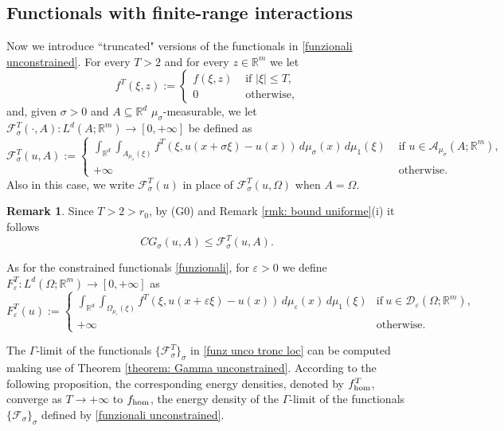\documentclass{article}
\theoremstyle{plain}
\theoremstyle{definition}
\newtheorem{remark}[theorem]{Remark}
\def\e{\varepsilon}
\def\rr{{\mathbb R}}
\def\ms{\mu_\sigma}
\newcommand{\s}{\sigma}
\newcommand{\A}{\mathcal{A}}
\newcommand{\F}{\mathcal{F}}
\numberwithin{equation}{section}
\begin{document}
\subsection{Functionals with finite-range interactions} Now we introduce ``truncated" versions of the functionals in \eqref{funzionali unconstrained}. For every $T>2$ and for every $z\in\rr^m$ we let
\begin{equation*}
    f^T(\xi,z):=\begin{cases} f(\xi,z) &\text{ if } |\xi|\leq T, \\
    0 &\text{ otherwise},
\end{cases}
\end{equation*}
 and, given $\s>0$ and $A\subseteq\rr^d$ $\ms$-measurable, we let $\mathcal{F}^T_\s(\cdot, A):L^d(A;\mathbb{R}^{m})\rightarrow [0,+\infty]$ be defined as
\begin{equation}\label{funz unco tronc loc}
\mathcal{F}^T_{\s}(u,A):=\begin{cases}
\displaystyle\int_{\mathbb{R}^{d}}\int_{A_{\ms}(\xi)}f^T(\xi, u(x+\s\xi)-u(x))\, d\ms(x)\, d\mu_1(\xi) & \text{ if } u\in\A_{\ms}(A;\rr^m),\\[3pt]
+\infty & \text{ otherwise}.
\end{cases}
\end{equation}
Also in this case, we write $\mathcal{F}^T_\s(u)$ in place of $\mathcal{F}^T_\s(u,\Omega)$ when $A=\Omega$. 
\begin{remark} Since $T>2>r_0$, by (G0) and Remark \ref{rmk: bound uniforme}(i) it follows
    \begin{equation}\label{eq: riferimento lower} 
       CG_\s(u,A)\leq  \F^T_\s(u,A).
    \end{equation}
\end{remark}

As for the constrained functionals \eqref{funzionali}, for $\e>0$ we define $F^T_\e:L^d(\Omega;\mathbb{R}^{m})\rightarrow [0,+\infty]$ as 
\begin{equation} \label{funz tronc loc}
    F^T_{\varepsilon}(u):=
     \begin{cases}
\displaystyle\int_{\mathbb{R}^{d}}\int_{\Omega_{\mu_\e}(\xi)}f^T(\xi, u(x+\e\xi)-u(x))\, d\mu_\e(x)\, d\mu_1(\xi) &\text{if}\  u \in \mathcal{D}_\e(\Omega;\mathbb{R}^m), \\
        +\infty &\text{otherwise}.
    \end{cases}
\end{equation}      

The $\Gamma$-limit of the functionals $\{\F^T_\s\}_\s$ in \eqref{funz unco tronc loc} can be computed making use of Theorem \ref{theorem: Gamma unconstrained}.  According to the following proposition, the corresponding energy densities, denoted by $f_{\rm hom}^T$, converge as $T\to+\infty$ to $f_{\rm hom}$, the energy density of the $\Gamma$-limit of the functionals $\{\F_\s\}_\s$ defined by \eqref{funzionali unconstrained}.
\end{document}
